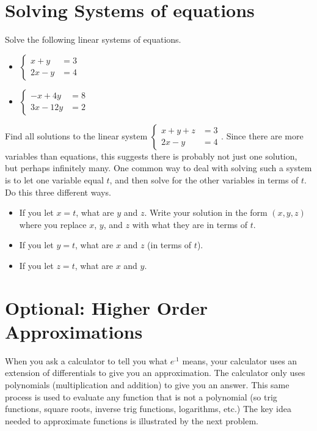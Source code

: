 \section{Solving Systems of equations}


\begin{problem}
		Solve the following linear systems of equations.
\begin{itemize}
\item $\begin{cases}x+y&=3\\2x-y&=4\end{cases}$
\item $\begin{cases}-x + 4y&=8\\3x - 12y&=2\end{cases}$
\end{itemize}
\end{problem}

\begin{problem}
Find all solutions to the linear system 
$\begin{cases}x+y+z&=3\\2x-y&=4\end{cases}$.  
Since there are more variables than equations, this suggests there is probably not just one solution, but perhaps infinitely many.  One common way to deal with solving such a system is to let one variable equal $t$, and then solve for the other variables in terms of $t$. Do this three different ways.
\begin{itemize}
\item If you let $x=t$, what are $y$ and $z$.  Write your solution in the form $(x,y,z)$ where you replace $x$, $y$, and $z$ with what they are in terms of $t$.
\item If you let $y=t$, what are $x$ and $z$ (in terms of $t$).
\item If you let $z=t$, what are $x$ and $y$.
\end{itemize}
\end{problem}


\newpage
\section{Optional: Higher Order Approximations} 
When you ask a calculator to tell you what $e^{.1}$ means, your calculator uses an extension of differentials to give you an approximation.  The calculator only uses polynomials (multiplication and addition) to give you an answer.  This same process is used to evaluate any function that is not a polynomial (so trig functions, square roots, inverse trig functions, logarithms, etc.) 
The key idea needed to approximate functions is illustrated by the next problem.

